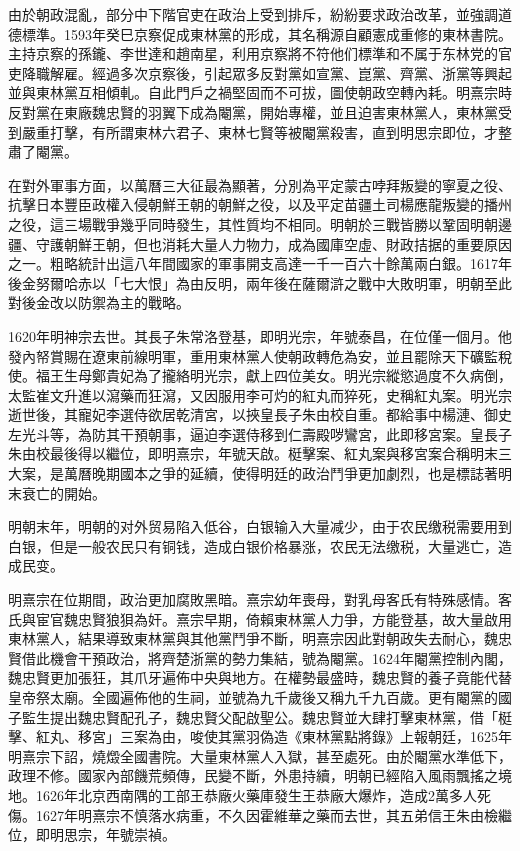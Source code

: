 由於朝政混亂，部分中下階官吏在政治上受到排斥，紛紛要求政治改革，並強調道德標準。1593年癸巳京察促成東林黨的形成，其名稱源自顧憲成重修的東林書院。主持京察的孫鑨、李世達和趙南星，利用京察將不符他们標準和不属于东林党的官吏降職解雇。經過多次京察後，引起眾多反對黨如宣黨、崑黨、齊黨、浙黨等興起並與東林黨互相傾軋。自此門戶之禍堅固而不可拔，圖使朝政空轉內耗。明熹宗時反對黨在東廠魏忠賢的羽翼下成為閹黨，開始專權，並且迫害東林黨人，東林黨受到嚴重打擊，有所謂東林六君子、東林七賢等被閹黨殺害，直到明思宗即位，才整肅了閹黨。

在對外軍事方面，以萬曆三大征最為顯著，分別為平定蒙古哱拜叛變的寧夏之役、抗擊日本豐臣政權入侵朝鮮王朝的朝鮮之役，以及平定苗疆土司楊應龍叛變的播州之役，這三場戰爭幾乎同時發生，其性質均不相同。明朝於三戰皆勝以鞏固明朝邊疆、守護朝鮮王朝，但也消耗大量人力物力，成為國庫空虛、財政拮据的重要原因之一。粗略統計出這八年間國家的軍事開支高達一千一百六十餘萬兩白銀。1617年後金努爾哈赤以「七大恨」為由反明，兩年後在薩爾滸之戰中大敗明軍，明朝至此對後金改以防禦為主的戰略。

1620年明神宗去世。其長子朱常洛登基，即明光宗，年號泰昌，在位僅一個月。他發內帑賞賜在遼東前線明軍，重用東林黨人使朝政轉危為安，並且罷除天下礦監稅使。福王生母鄭貴妃為了攏絡明光宗，獻上四位美女。明光宗縱慾過度不久病倒，太監崔文升進以瀉藥而狂瀉，又因服用李可灼的紅丸而猝死，史稱紅丸案。明光宗逝世後，其寵妃李選侍欲居乾清宮，以挾皇長子朱由校自重。都給事中楊漣、御史左光斗等，為防其干預朝事，逼迫李選侍移到仁壽殿哕鸞宮，此即移宮案。皇長子朱由校最後得以繼位，即明熹宗，年號天啟。梃擊案、紅丸案與移宮案合稱明末三大案，是萬曆晚期國本之爭的延續，使得明廷的政治鬥爭更加劇烈，也是標誌著明末衰亡的開始。

明朝末年，明朝的对外贸易陷入低谷，白银输入大量减少，由于农民缴税需要用到白银，但是一般农民只有铜钱，造成白银价格暴涨，农民无法缴税，大量逃亡，造成民变。

明熹宗在位期間，政治更加腐敗黑暗。熹宗幼年喪母，對乳母客氏有特殊感情。客氏與宦官魏忠賢狼狽為奸。熹宗早期，倚賴東林黨人力爭，方能登基，故大量啟用東林黨人，結果導致東林黨與其他黨鬥爭不斷，明熹宗因此對朝政失去耐心，魏忠賢借此機會干預政治，將齊楚浙黨的勢力集結，號為閹黨。1624年閹黨控制內閣，魏忠賢更加張狂，其爪牙遍佈中央與地方。在權勢最盛時，魏忠賢的養子竟能代替皇帝祭太廟。全國遍佈他的生祠，並號為九千歲後又稱九千九百歲。更有閹黨的國子監生提出魏忠賢配孔子，魏忠賢父配啟聖公。魏忠賢並大肆打擊東林黨，借「梃擊、紅丸、移宮」三案為由，唆使其黨羽偽造《東林黨點將錄》上報朝廷，1625年明熹宗下詔，燒燬全國書院。大量東林黨人入獄，甚至處死。由於閹黨水準低下，政理不修。國家內部饑荒頻傳，民變不斷，外患持續，明朝已經陷入風雨飄搖之境地。1626年北京西南隅的工部王恭廠火藥庫發生王恭廠大爆炸，造成2萬多人死傷。1627年明熹宗不慎落水病重，不久因霍維華之藥而去世，其五弟信王朱由檢繼位，即明思宗，年號崇禎。

